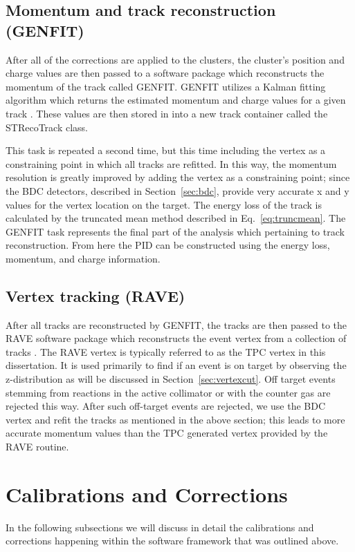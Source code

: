 \subsection{Momentum and track reconstruction (GENFIT)}
After all of the corrections are applied to the clusters, the cluster's position and charge values are then passed to a software package which reconstructs the momentum of the track called GENFIT. GENFIT utilizes a Kalman fitting algorithm which returns the estimated momentum and charge values for a given track \cite{genfit}. These values are then stored in into a new track container called the STRecoTrack class. 

This task is repeated a second time, but this time including the vertex as a constraining point in which all tracks are refitted. In this way, the momentum resolution is greatly improved by adding the vertex as a constraining point; since the BDC detectors, described in Section~\ref{sec:bdc}, provide very accurate x and y values for the vertex location on the target. The energy loss of the track is calculated by the truncated mean method described in Eq.~\ref{eq:truncmean}. The GENFIT task represents the final part of the analysis which pertaining to track reconstruction. From here the PID can be constructed using the energy loss, momentum, and charge information. 

\subsection{Vertex tracking (RAVE)}
\label{sec:vertex}
After all tracks are reconstructed by GENFIT, the tracks are then passed to the RAVE software package which reconstructs the event vertex from a collection of tracks \cite{rave}.  The RAVE vertex is typically referred to as the TPC vertex in this dissertation. It is used primarily to find if an event is on target by observing the z-distribution as will be discussed in Section~\ref{sec:vertexcut}. Off target events stemming from reactions in the active collimator or with the counter gas are rejected this way. After such off-target events are rejected,  we use the BDC vertex and refit the tracks as mentioned in the above section; this leads to more accurate momentum values than the TPC generated vertex provided by the RAVE routine. 



\section{Calibrations and Corrections}
In the following subsections we will discuss in detail the calibrations and corrections happening within the software framework that was outlined above.  

